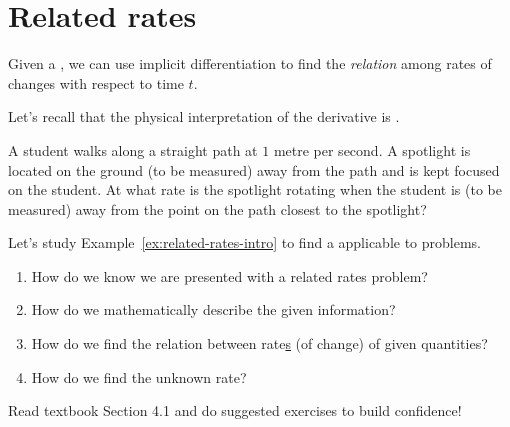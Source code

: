 \documentclass[../main.tex]{subfiles}
\begin{document}
 \section{Related rates}
  Given a , we can use implicit differentiation  to find the \emph{relation} among rates of changes with respect to time \(t\).

  Let's recall that the physical interpretation of the derivative is .
  \begin{example} \label{ex:related-rates-intro}
    A student walks along a straight path at \(1\) metre per second.  A spotlight is located on the ground (to be measured) \underline{\hspace{1in}} away from the path and is kept focused on the student. At what rate is the spotlight rotating when the student is (to be measured) \underline{\hspace{1in}} away from the point on the path closest to the spotlight?
  \end{example}


  Let's study Example~\ref{ex:related-rates-intro} to find a  applicable to   problems. 
  \begin{enumerate}
    \item How do we know we are presented with a related rates problem?


    \item How do we mathematically describe the given information?


    \item How do we find the relation between rate\underline{s} (of change) of given quantities?


    \item How do we find the unknown rate?

  \end{enumerate}

  \faStar{} Read textbook Section 4.1 and do suggested exercises to build confidence!
\end{document}
